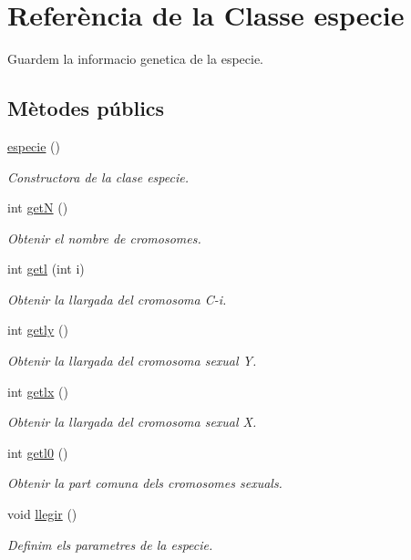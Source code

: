 \hypertarget{classespecie}{}\section{Referència de la Classe especie}
\label{classespecie}


Guardem la informacio genetica de la especie.  


\subsection*{Mètodes públics}
\begin{DoxyCompactItemize}
\item 
\hyperlink{classespecie_ac172ff6414744de38a9995de5b8960e6}{especie} ()
\begin{DoxyCompactList}\small\item\em Constructora de la clase especie. \end{DoxyCompactList}\item 
int \hyperlink{classespecie_a16cbac301660254cf39ef7f51690e507}{getN} ()
\begin{DoxyCompactList}\small\item\em Obtenir el nombre de cromosomes. \end{DoxyCompactList}\item 
int \hyperlink{classespecie_ac09e154b4eae25155af3bdc98c2a18c3}{getl} (int i)
\begin{DoxyCompactList}\small\item\em Obtenir la llargada del cromosoma C-\/i. \end{DoxyCompactList}\item 
int \hyperlink{classespecie_aeae1b17938e4527858ad4d3f5949d182}{getly} ()
\begin{DoxyCompactList}\small\item\em Obtenir la llargada del cromosoma sexual Y. \end{DoxyCompactList}\item 
int \hyperlink{classespecie_a98735feb10fd44e1316708566790ca95}{getlx} ()
\begin{DoxyCompactList}\small\item\em Obtenir la llargada del cromosoma sexual X. \end{DoxyCompactList}\item 
int \hyperlink{classespecie_a5ea723fe64398cd46cbc6e044b114fff}{getl0} ()
\begin{DoxyCompactList}\small\item\em Obtenir la part comuna dels cromosomes sexuals. \end{DoxyCompactList}\item 
void \hyperlink{classespecie_af1a08ff40fdb79abb1d78c06b8131306}{llegir} ()
\begin{DoxyCompactList}\small\item\em Definim els parametres de la especie. \end{DoxyCompactList}\end{DoxyCompactItemize}
